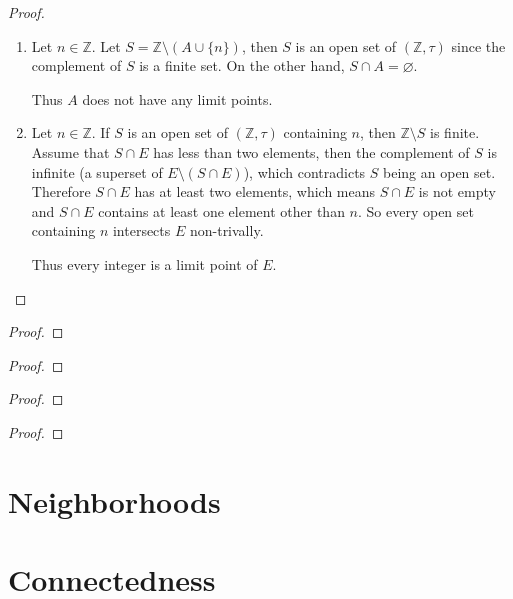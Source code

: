 \begin{proof}
    \begin{enumerate}[label={(\roman*)}]
        \item Let $n\in\mathbb{Z}$. Let $S = \mathbb{Z} \setminus (A\cup \{n\})$, then $S$ is an open set of $(\mathbb{Z}, \tau)$ since the complement of $S$ is a finite set. On the other hand, $S\cap A = \varnothing$.

              Thus $A$ does not have any limit points.
        \item Let $n\in\mathbb{Z}$. If $S$ is an open set of $(\mathbb{Z}, \tau)$ containing $n$, then $\mathbb{Z}\setminus S$ is finite. Assume that $S\cap E$ has less than two elements, then the complement of $S$ is infinite (a superset of $E\setminus (S\cap E)$), which contradicts $S$ being an open set. Therefore $S\cap E$ has at least two elements, which means $S\cap E$ is not empty and $S\cap E$ contains at least one element other than $n$. So every open set containing $n$ intersects $E$ non-trivally.

              Thus every integer is a limit point of $E$.
    \end{enumerate}
\end{proof}
\newpage

\begin{exercise}
\end{exercise}

\begin{proof}
\end{proof}
\newpage

\begin{exercise}
\end{exercise}

\begin{proof}
\end{proof}
\newpage

\begin{exercise}
\end{exercise}

\begin{proof}
\end{proof}
\newpage

\begin{exercise}
\end{exercise}

\begin{proof}
\end{proof}
\newpage

\section{Neighborhoods}



\section{Connectedness}

